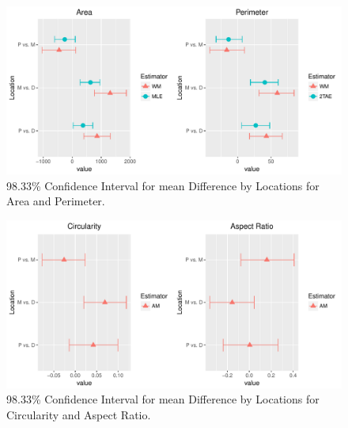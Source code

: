 \documentclass{article}\usepackage[]{graphicx}\usepackage[]{color}
\makeatletter
\def\maxwidth{ %
  \ifdim\Gin@nat@width>\linewidth
    \linewidth
  \else
    \Gin@nat@width
  \fi
}
\newenvironment{knitrout}{}{} %
\numberwithin{figure}{subsection} %
\numberwithin{table}{subsection} %
\makeatother
\begin{document}
\begin{figure}[!htbp]
  \centering
\begin{knitrout}
\color{fgcolor}
\includegraphics[width=\maxwidth]{figure/unnamed-chunk-16-1} 

\end{knitrout}
  \caption{98.33\% Confidence Interval for mean Difference by Locations for Area and Perimeter.}
  \label{m_area_per_diff}
\end{figure}
\vspace{0.5cm}

\begin{figure}[!htbp]
  \centering
\begin{knitrout}
\color{fgcolor}
\includegraphics[width=\maxwidth]{figure/unnamed-chunk-17-1} 

\end{knitrout}
  \caption{98.33\% Confidence Interval for mean Difference by Locations for Circularity and Aspect Ratio.}
  \label{m_cir_ar_diff}
\end{figure}
\vspace{0.5cm}
\end{document}
